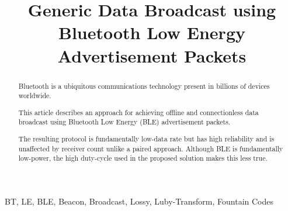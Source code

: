 \documentclass[conference]{IEEEtran} %
\begin{document}
\title{Generic Data Broadcast using Bluetooth Low Energy Advertisement Packets\\
}

\author{
\and
{}
}
\maketitle

\begin{abstract}
Bluetooth is a ubiquitous communications technology present in billions of devices worldwide.



This article describes an approach for achieving offline and connectionless data broadcast using Bluetooth Low Energy (BLE) advertisement packets. 

The resulting protocol is fundamentally low-data rate but has high reliability and is unaffected by receiver count unlike a paired approach.
Although BLE is fundamentally low-power, the high duty-cycle used in the proposed solution makes this less true. 

\end{abstract}

\begin{IEEEkeywords}
BT, LE, BLE, Beacon, Broadcast, Lossy, Luby-Transform, Fountain Codes
\end{IEEEkeywords}
\end{document}
